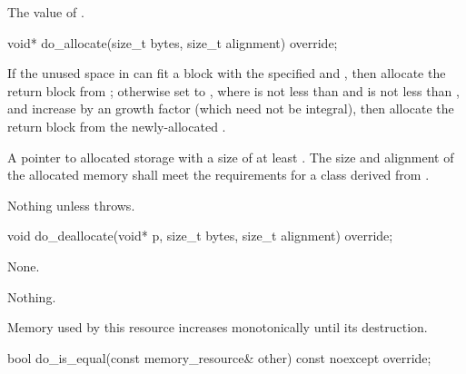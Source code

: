 \begin{itemdescr}
\pnum
\returns
The value of .
\end{itemdescr}

%
\begin{itemdecl}
void* do_allocate(size_t bytes, size_t alignment) override;
\end{itemdecl}

\begin{itemdescr}
\pnum
\effects
If the unused space in 
can fit a block with the specified  and ,
then allocate the return block from ;
otherwise set  to ,
where  is not less than  and
 is not less than ,
and increase 
by an  growth factor (which need not be integral),
then allocate the return block from the newly-allocated .

\pnum
\returns
A pointer to allocated storage
with a size of at least .
The size and alignment of the allocated memory shall meet the requirements
for a class derived from .

\pnum
\throws
Nothing unless  throws.
\end{itemdescr}

%
\begin{itemdecl}
void do_deallocate(void* p, size_t bytes, size_t alignment) override;
\end{itemdecl}

\begin{itemdescr}
\pnum
\effects
None.

\pnum
\throws
Nothing.

\pnum
\remarks
Memory used by this resource increases monotonically until its destruction.
\end{itemdescr}

%
\begin{itemdecl}
bool do_is_equal(const memory_resource& other) const noexcept override;
\end{itemdecl}

